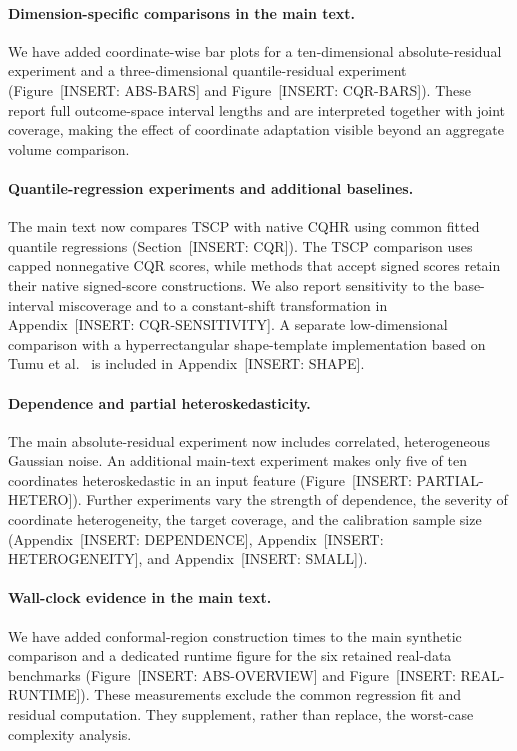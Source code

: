 \documentclass[11pt]{article}
\numberwithin{equation}{section}
\newcommand{\pending}[1]{\textcolor{AuthorRed}{[INSERT: #1]}}
\newcommand{\SecCQR}{Section~\pending{CQR}} %
\newcommand{\AppDependence}{Appendix~\pending{DEPENDENCE}} %
\newcommand{\AppHeterogeneity}{Appendix~\pending{HETEROGENEITY}} %
\newcommand{\AppSmall}{Appendix~\pending{SMALL}} %
\newcommand{\AppCQR}{Appendix~\pending{CQR-SENSITIVITY}} %
\newcommand{\AppShape}{Appendix~\pending{SHAPE}} %
\newcommand{\FigAbsolute}{Figure~\pending{ABS-OVERVIEW}} %
\newcommand{\FigAbsoluteBars}{Figure~\pending{ABS-BARS}} %
\newcommand{\FigHeteroskedastic}{Figure~\pending{PARTIAL-HETERO}} %
\newcommand{\FigCQBars}{Figure~\pending{CQR-BARS}} %
\newcommand{\FigRuntime}{Figure~\pending{REAL-RUNTIME}} %
\begin{document}
\paragraph{Dimension-specific comparisons in the main text.}
We have added coordinate-wise bar plots for a ten-dimensional
absolute-residual experiment and a three-dimensional quantile-residual
experiment (\FigAbsoluteBars{} and \FigCQBars{}). These report full
outcome-space interval lengths and are interpreted together with joint
coverage, making the effect of coordinate adaptation visible beyond an
aggregate volume comparison.

\paragraph{Quantile-regression experiments and additional baselines.}
The main text now compares TSCP with native CQHR using common fitted
quantile regressions (\SecCQR{}). The TSCP comparison uses capped
nonnegative CQR scores, while methods that accept signed scores retain
their native signed-score constructions. We also report sensitivity to
the base-interval miscoverage and to a constant-shift transformation in
\AppCQR{}. A separate low-dimensional comparison with a hyperrectangular
shape-template implementation based on Tumu et al.\ \cite{tumu2024} is
included in \AppShape{}.

\paragraph{Dependence and partial heteroskedasticity.}
The main absolute-residual experiment now includes correlated,
heterogeneous Gaussian noise. An additional main-text experiment makes
only five of ten coordinates heteroskedastic in an input feature
(\FigHeteroskedastic{}). Further experiments vary the strength of
dependence, the severity of coordinate heterogeneity, the target coverage,
and the calibration sample size (\AppDependence{}, \AppHeterogeneity{},
and \AppSmall{}).

\paragraph{Wall-clock evidence in the main text.}
We have added conformal-region construction times to the main synthetic
comparison and a dedicated runtime figure for the six retained real-data
benchmarks (\FigAbsolute{} and \FigRuntime{}). These measurements exclude
the common regression fit and residual computation. They supplement,
rather than replace, the worst-case complexity analysis.
\end{document}
